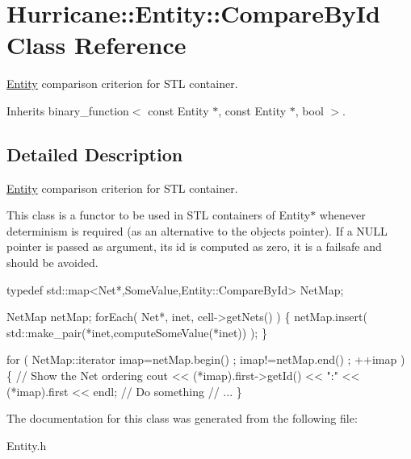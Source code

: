 \hypertarget{structHurricane_1_1Entity_1_1CompareById}{}\section{Hurricane\+:\+:Entity\+:\+:Compare\+By\+Id Class Reference}
\label{structHurricane_1_1Entity_1_1CompareById}


\hyperlink{classHurricane_1_1Entity}{Entity} comparison criterion for S\+TL container.  




Inherits binary\+\_\+function$<$ const Entity $\ast$, const Entity $\ast$, bool $>$.



\subsection{Detailed Description}
\hyperlink{classHurricane_1_1Entity}{Entity} comparison criterion for S\+TL container. 

This class is a functor to be used in S\+TL containers of {\ttfamily Entity$\ast$} whenever determinism is required (as an alternative to the object\textquotesingle{}s pointer). If a {\ttfamily N\+U\+LL} pointer is passed as argument, it\textquotesingle{}s {\ttfamily id} is computed as zero, it is a failsafe and should be avoided.


\begin{DoxyCode}
\textcolor{keyword}{typedef}  std::map<Net*,SomeValue,Entity::CompareById>  NetMap;

NetMap  netMap;
forEach( Net*, inet, cell->getNets() ) \{
  netMap.insert( std::make\_pair(*inet,computeSomeValue(*inet)) );
\}

\textcolor{keywordflow}{for} ( NetMap::iterator imap=netMap.begin() ; imap!=netMap.end() ; ++imap ) \{
  \textcolor{comment}{// Show the Net ordering}
  cout << (*imap).first->getId() << \textcolor{stringliteral}{":"} << (*imap).first << endl;
  \textcolor{comment}{// Do something}
  \textcolor{comment}{// ...}
\}
\end{DoxyCode}
 

The documentation for this class was generated from the following file\+:\begin{DoxyCompactItemize}
\item 
Entity.\+h\end{DoxyCompactItemize}
